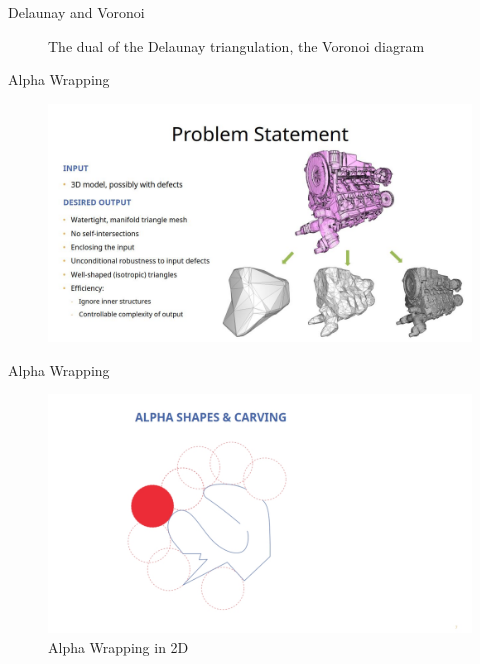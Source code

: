 \documentclass[10pt]{beamer}
\begin{document}
\begin{frame}{Delaunay and Voronoi}
\begin{figure}[H]
\begin{minipage}{0.49\textwidth}
        \caption{The dual of the Delaunay triangulation, the Voronoi diagram}
    \end{minipage}
  \end{figure}
\end{frame}



\begin{frame}{Alpha Wrapping}
  \begin{figure}[H]
    \hspace*{-1cm}
    \includegraphics[width=1.2\textwidth]{images/alpha-wrapping.jpg}
  \end{figure}
\end{frame}

\begin{frame}{Alpha Wrapping}
  \begin{figure}[H]
    \centering
    \includegraphics[width=1.1\textwidth]{images/alpha-wrapping1.jpg}
    \caption{Alpha Wrapping in 2D}
\end{figure}
\end{frame}
\end{document}
